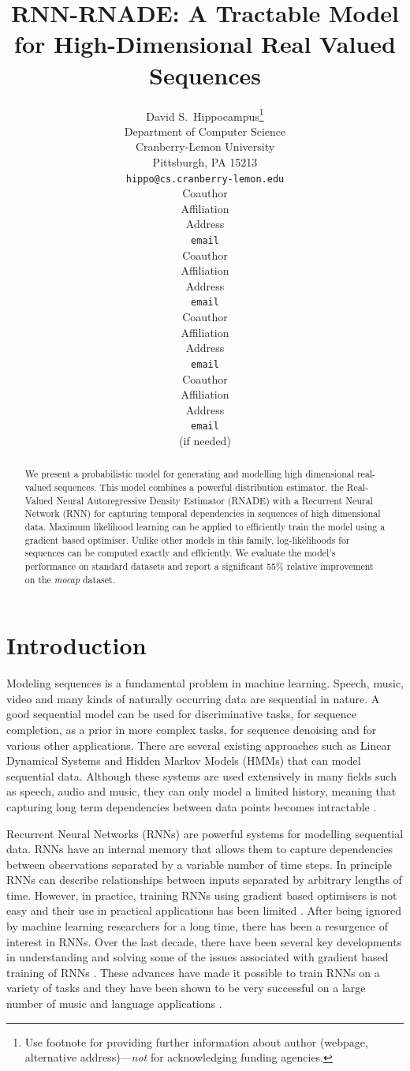 \documentclass{article} %
\title{RNN-RNADE: A Tractable Model for High-Dimensional Real Valued Sequences}
\author{
David S.~Hippocampus\thanks{ Use footnote for providing further information
about author (webpage, alternative address)---\emph{not} for acknowledging
funding agencies.} \\
Department of Computer Science\\
Cranberry-Lemon University\\
Pittsburgh, PA 15213 \\
\texttt{hippo@cs.cranberry-lemon.edu} \\
\And
Coauthor \\
Affiliation \\
Address \\
\texttt{email} \\
\AND
Coauthor \\
Affiliation \\
Address \\
\texttt{email} \\
\And
Coauthor \\
Affiliation \\
Address \\
\texttt{email} \\
\And
Coauthor \\
Affiliation \\
Address \\
\texttt{email} \\
(if needed)\\
}
\begin{document}
\maketitle

\begin{abstract}
We present a probabilistic model for generating and modelling high dimensional real-valued sequences. This model combines a powerful distribution estimator, the Real-Valued Neural Autoregressive Density Estimator (RNADE) with a Recurrent Neural Network (RNN) for capturing temporal dependencies in sequences of high dimensional data. Maximum likelihood learning can be applied to efficiently train the model using a gradient based optimiser. Unlike other models in this family, log-likelihoods for sequences can be computed exactly and efficiently. We evaluate the model's performance on standard datasets and report a significant 55\% relative improvement on the \textit{mocap} dataset. 
\end{abstract}

\section{Introduction}
\label{intro}
Modeling sequences is a fundamental problem in machine learning. Speech, music, video and many kinds of naturally occurring data are sequential in nature. A good sequential model can be used for discriminative tasks, for sequence completion, as a prior in more complex tasks, for sequence denoising and for various other applications. There are several existing approaches such as Linear Dynamical Systems and Hidden Markov Models (HMMs) that can model sequential data. Although these systems are used extensively in many fields such as speech, audio and music, they can only model a limited history, meaning that capturing long term dependencies between data points becomes intractable \cite{sutskever2007learning}. 

Recurrent Neural Networks (RNNs) are powerful systems for modelling sequential data. RNNs have an internal memory that allows them to capture dependencies between observations separated by a variable number of time steps. In principle RNNs can describe relationships between inputs separated by arbitrary lengths of time. However, in practice, training RNNs using gradient based optimisers is not easy and their use in practical applications has been limited \cite{bengio2012advances}. After being ignored by machine learning researchers for a long time, there has been a resurgence of interest in RNNs. Over the last decade, there have been several key developments in understanding and solving some of the issues associated with gradient based training of RNNs \cite{Martens2011,bengio2012advances}. These advances have made it possible to train RNNs on a variety of tasks and they have been shown to be very successful on a large number of music and language applications \cite{mikolov2011empirical,Boulanger-Lewandowski2012,bengio2012advances}. 
\end{document}
